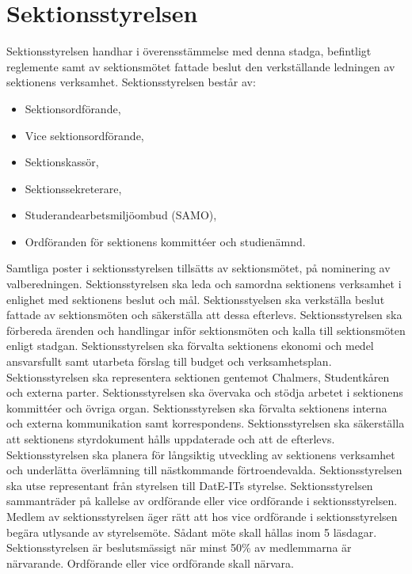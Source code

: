 \documentclass[a4paper]{dteklag}
\begin{document}
\section{Sektionsstyrelsen}
 Sektionsstyrelsen handhar i överensstämmelse med denna stadga, befintligt reglemente samt av sektionsmötet fattade beslut den verkställande ledningen av sektionens verksamhet.
\para Sektionsstyrelsen består av:
\begin{itemize}\setlength\itemsep{0em}
\item Sektionsordförande,
\item Vice sektionsordförande,
\item Sektionskassör,
\item Sektionssekreterare,
\item Studerandearbetsmiljöombud (SAMO),
\item Ordföranden för sektionens kommittéer och studienämnd.
\end{itemize}
\para Samtliga poster i sektionsstyrelsen tillsätts av sektionsmötet, på nominering av valberedningen.
\para[Åligganden] Sektionsstyrelsen ska leda och samordna sektionens verksamhet i enlighet med sektionens beslut och mål.
\para Sektionsstyelsen ska verkställa beslut fattade av sektionsmöten och säkerställa att dessa efterlevs.
\para Sektionsstyrelsen ska förbereda ärenden och handlingar inför sektionsmöten och kalla till sektionsmöten enligt stadgan.
\para Sektionsstyrelsen ska förvalta sektionens ekonomi och medel ansvarsfullt samt utarbeta förslag till budget och verksamhetsplan.
\para Sektionsstyrelsen ska representera sektionen gentemot Chalmers, Studentkåren och externa parter.
\para Sektionsstyrelsen ska övervaka och stödja arbetet i sektionens kommittéer och övriga organ.
\para Sektionsstyrelsen ska förvalta sektionens interna och externa kommunikation samt korrespondens.
\para Sektionsstyrelsen ska säkerställa att sektionens styrdokument hålls uppdaterade och att de efterlevs.
\para Sektionsstyrelsen ska planera för långsiktig utveckling av sektionens verksamhet och underlätta överlämning till nästkommande förtroendevalda.
\para Sektionsstyrelsen ska utse representant från styrelsen till DatE-ITs styrelse.
\para[Styrelsemöte] Sektionsstyrelsen sammanträder på kallelse av ordförande eller vice ordförande i sektionsstyrelsen.
\para Medlem av sektionsstyrelsen äger rätt att hos vice ordförande i sektionsstyrelsen begära utlysande av styrelsemöte.
\stycke Sådant möte skall hållas inom 5 läsdagar.
\para Sektionsstyrelsen är beslutsmässigt när minst 50\% av medlemmarna är närvarande. Ordförande eller vice ordförande skall närvara.
\end{document}

